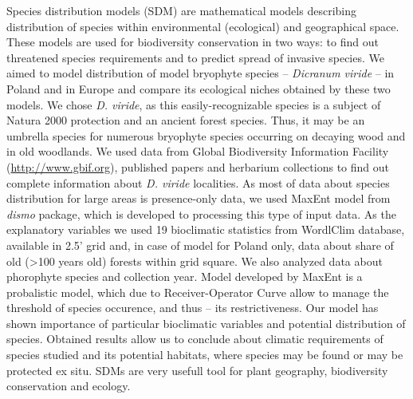 \documentclass[11pt, a4paper]{article}
\begin{document}
Species distribution models (SDM) are mathematical models describing
distribution of species within environmental (ecological) and
geographical space. These models are used for biodiversity conservation
in two ways: to find out threatened species requirements and to predict
spread of invasive species. We aimed to model distribution of model
bryophyte species -- \emph{Dicranum viride} -- in Poland and in Europe
and compare its ecological niches obtained by these two models. We chose
\emph{D. viride}, as this easily-recognizable species is a subject of
Natura 2000 protection and an ancient forest species. Thus, it may be an
umbrella species for numerous bryophyte species occurring on decaying
wood and in old woodlands. We used data from Global Biodiversity
Information Facility (\url{http://www.gbif.org}), published papers and
herbarium collections to find out complete information about \emph{D.
viride} localities. As most of data about species distribution for large
areas is presence-only data, we used MaxEnt model from \emph{dismo}
package, which is developed to processing this type of input data. As
the explanatory variables we used 19 bioclimatic statistics from
WordlClim database, available in 2.5' grid and, in case of model for
Poland only, data about share of old (\textgreater{}100 years old)
forests within grid square. We also analyzed data about phorophyte
species and collection year. Model developed by MaxEnt is a probalistic
model, which due to Receiver-Operator Curve allow to manage the
threshold of species occurence, and thus -- its restrictiveness. Our
model has shown importance of particular bioclimatic variables and
potential distribution of species. Obtained results allow us to conclude
about climatic requirements of species studied and its potential
habitats, where species may be found or may be protected ex situ. SDMs
are very usefull tool for plant geography, biodiversity conservation and
ecology.
\end{document}
